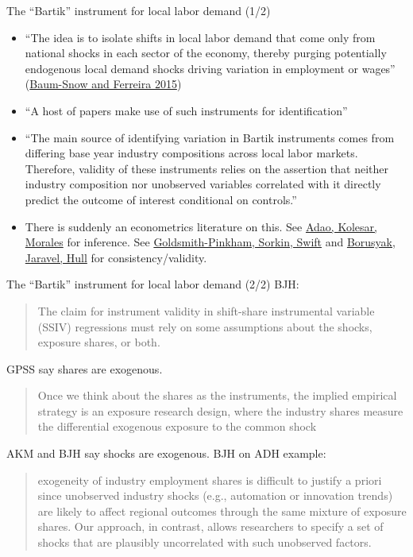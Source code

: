 \documentclass[11pt,notes=hide,aspectratio=169]{beamer}
\begin{document}
\begin{frame}{The ``Bartik'' instrument for local labor demand (1/2)}
\begin{itemize}
	\item {\small ``The idea is to isolate shifts in local labor demand that come only from national shocks in each sector of the economy, thereby purging potentially endogenous local demand shocks driving variation in employment or wages'' (\href{https://ideas.repec.org/h/eee/regchp/5-3.html}{Baum-Snow and Ferreira 2015})\par}
	\item ``A host of papers make use of such instruments for identification''
	\item {\small ``The main source of identifying variation in Bartik instruments comes from differing base year industry compositions across local labor markets. Therefore, validity of these instruments relies on the assertion that neither industry composition nor unobserved variables correlated with it directly predict the outcome of interest conditional on controls.''\par}
	\item There is suddenly an econometrics literature on this. 
	See \href{https://academic.oup.com/qje/article-abstract/134/4/1949/5552146}{Adao, Kolesar, Morales} for inference.
	See \href{https://www.aeaweb.org/articles?id=10.1257/aer.20181047}{Goldsmith-Pinkham, Sorkin, Swift} and \href{http://about.peterhull.net/wp}{Borusyak, Jaravel, Hull} for consistency/validity.
\end{itemize}
\end{frame}
\begin{frame}{The ``Bartik'' instrument for local labor demand (2/2)}
BJH:
\begin{quote}{\small
The claim for instrument validity in shift-share instrumental variable (SSIV) regressions must rely on some assumptions about the shocks, exposure shares, or both.\par
\par}\end{quote}
GPSS say shares are exogenous.
\begin{quote}{\small
Once we think about the shares as the instruments, the implied empirical strategy is an exposure research design, where the industry shares measure the differential exogenous exposure to the common shock
\par}\end{quote}
AKM and BJH say shocks are exogenous.
BJH on ADH example:
\begin{quote}{\small
exogeneity of industry employment shares is difficult to justify a priori since unobserved industry shocks (e.g., automation or innovation trends) are likely to affect regional outcomes through the same mixture of exposure shares. Our approach, in contrast, allows researchers to specify a set of shocks that are plausibly uncorrelated with such unobserved factors.\par
\par}\end{quote}
\end{frame}
\end{document}
